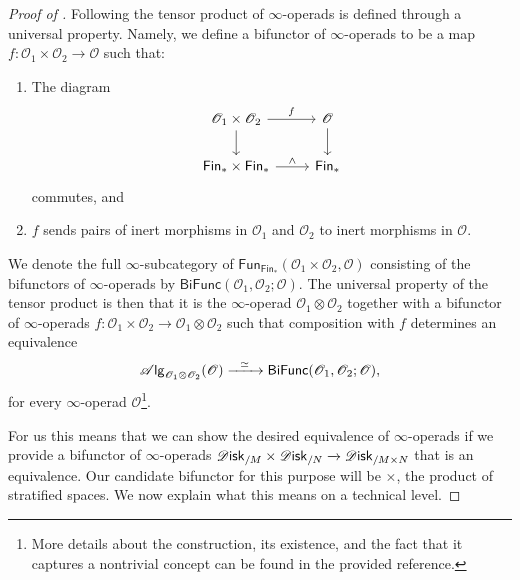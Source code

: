 \documentclass[../text.tex]{subfiles}
\begin{document}
\begin{proof}[Proof of ]
    Following \cite[\S.2.2.5]{lurie_ha} the tensor product of $\infty$-operads is defined through a universal property. Namely, we define a bifunctor of $\infty$-operads to be a map $f: \mathscr{O}_1 \times \mathscr{O}_2 \xrightarrow{} \mathscr{O}$ such that:
    \begin{enumerate}
        \item The diagram
        \begin{equation}
            \begin{tikzcd}
                \mathscr{O}_1 \times \mathscr{O}_2 \arrow[r, "f"] \arrow[d] & \mathscr{O} \arrow[d] \\
                \mathsf{Fin}_* \times \mathsf{Fin}_* \arrow[r, "\wedge"] & \mathsf{Fin}_*
            \end{tikzcd}
        \end{equation}
        commutes, and
        \item $f$ sends pairs of inert morphisms in $\mathscr{O}_1$ and $\mathscr{O}_2$ to inert morphisms in $\mathscr{O}$.
    \end{enumerate}
    We denote the full $\infty$-subcategory of $\mathsf{Fun}_{\mathsf{Fin}_*}(\mathscr{O}_1 \times \mathscr{O}_2, \mathscr{O})$ consisting of the bifunctors of $\infty$-operads by $\mathsf{BiFunc}(\mathscr{O}_1, \mathscr{O}_2; \mathscr{O})$. The universal property of the tensor product is then that it is the $\infty$-operad $\mathscr{O}_1 \otimes \mathscr{O}_2$ together with a bifunctor of $\infty$-operads $f: \mathscr{O}_1 \times \mathscr{O}_2 \xrightarrow{} \mathscr{O}_1 \otimes \mathscr{O}_2$ such that composition with $f$ determines an equivalence
    \begin{equation}
        \mathscr{A} \mathsf{lg}_{\mathscr{O}_1 \otimes \mathscr{O}_2} (\mathscr{O}) \xrightarrow{\ \ \simeq \ \ } \mathsf{BiFunc}(\mathscr{O}_1, \mathscr{O}_2; \mathscr{O}),
    \end{equation}
    for every $\infty$-operad $\mathscr{O}$\footnote{More details about the construction, its existence, and the fact that it captures a nontrivial concept can be found in the provided reference.}.

    For us this means that we can show the desired equivalence of $\infty$-operads if we provide a bifunctor of $\infty$-operads $\disk_{/M} \times \disk_{/N} \xrightarrow{} \disk_{/M \times N}$ that is an equivalence. Our candidate bifunctor for this purpose will be $\times$, the product of stratified spaces. We now explain what this means on a technical level.


\end{proof}
\end{document}
